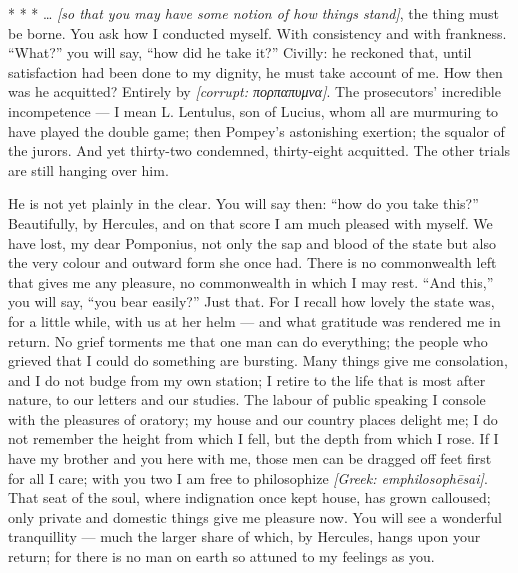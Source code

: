 

 * * * \dots{} \textit{[so that you may have some notion of how things stand]}, the thing must be borne. You ask how I conducted myself. With consistency and with frankness. ``What?'' you will say, ``how did he take it?'' Civilly: he reckoned that, until satisfaction had been done to my dignity, he must take account of me. How then was he acquitted? Entirely by \textit{[corrupt: \textgreek{πορπαπυμνα}]}. The prosecutors' incredible incompetence --- I mean L. Lentulus, son of Lucius, whom all are murmuring to have played the double game; then Pompey's astonishing exertion; the squalor of the jurors. And yet thirty-two condemned, thirty-eight acquitted. The other trials are still hanging over him.

 He is not yet plainly in the clear. You will say then: ``how do you take this?'' Beautifully, by Hercules, and on that score I am much pleased with myself. We have lost, my dear Pomponius, not only the sap and blood of the state but also the very colour and outward form she once had. There is no commonwealth left that gives me any pleasure, no commonwealth in which I may rest. ``And this,'' you will say, ``you bear easily?'' Just that. For I recall how lovely the state was, for a little while, with us at her helm --- and what gratitude was rendered me in return. No grief torments me that one man can do everything; the people who grieved that I could do something are bursting. Many things give me consolation, and I do not budge from my own station; I retire to the life that is most after nature, to our letters and our studies. The labour of public speaking I console with the pleasures of oratory; my house and our country places delight me; I do not remember the height from which I fell, but the depth from which I rose. If I have my brother and you here with me, those men can be dragged off feet first for all I care; with you two I am free to philosophize \textit{[Greek: emphilosophēsai]}. That seat of the soul, where indignation once kept house, has grown calloused; only private and domestic things give me pleasure now. You will see a wonderful tranquillity --- much the larger share of which, by Hercules, hangs upon your return; for there is no man on earth so attuned to my feelings as you.

